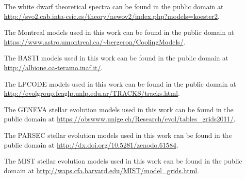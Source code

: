 \documentclass[fleqn,usenatbib]{rasti}
\begin{document}
The white dwarf theoretical spectra can be found in the public domain at \url{http://svo2.cab.inta-csic.es/theory/newov2/index.php?models=koester2}.

The Montreal models used in this work can be found in the public domain at \url{https://www.astro.umontreal.ca/~bergeron/CoolingModels/}.

The BASTI models used in this work can be found in the public domain at \url{http://albione.oa-teramo.inaf.it/}.

The LPCODE models used in this work can be found in the public domain at \url{http://evolgroup.fcaglp.unlp.edu.ar/TRACKS/tracks.html}.

The GENEVA stellar evolution models used in this work can be found in the public domain at \url{https://obswww.unige.ch/Research/evol/tables_grids2011/}.

The PARSEC stellar evolution models used in this work can be found in the public domain at \url{http://dx.doi.org/10.5281/zenodo.61584}.

The MIST stellar evolution models used in this work can be found in the public domain at \url{http://waps.cfa.harvard.edu/MIST/model_grids.html}.













\bsp	%
\label{lastpage}
\end{document}
